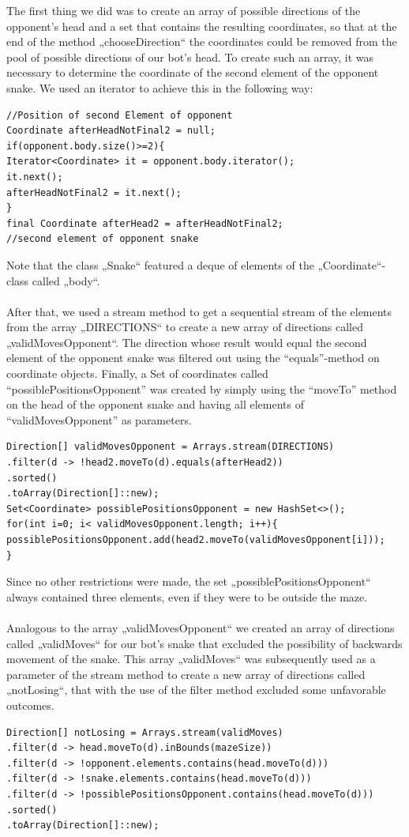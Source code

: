 \documentclass[a4paper,12pt]{article}
\begin{document}
The first thing we did was to create an array of possible directions of the opponent’s head and a set
that contains the resulting coordinates, so that at the end of the method „chooseDirection“ the
coordinates could be removed from the pool of possible directions of our bot’s head. To create such
an array, it was necessary to determine the coordinate of the second element of the opponent snake.
We used an iterator to achieve this in the following way:\\
\begin{verbatim}
//Position of second Element of opponent
Coordinate afterHeadNotFinal2 = null;
if(opponent.body.size()>=2){
Iterator<Coordinate> it = opponent.body.iterator();
it.next();
afterHeadNotFinal2 = it.next();
}
final Coordinate afterHead2 = afterHeadNotFinal2;
//second element of opponent snake
\end{verbatim}
Note that the class „Snake“ featured a deque of elements of the „Coordinate“-class called „body“.\\
\\
After that, we used a stream method to get a sequential stream of the elements from the array
„DIRECTIONS“ to create a new array of directions called „validMovesOpponent“. The direction
whose result would equal the second element of the opponent snake was filtered out using the “equals”-method on coordinate objects. Finally, a Set of coordinates called
“possiblePositionsOpponent” was created by simply using the “moveTo” method on the head of the
opponent snake and having all elements of “validMovesOpponent” as parameters.
\begin{verbatim}
Direction[] validMovesOpponent = Arrays.stream(DIRECTIONS)
.filter(d -> !head2.moveTo(d).equals(afterHead2))
.sorted()
.toArray(Direction[]::new);
Set<Coordinate> possiblePositionsOpponent = new HashSet<>();
for(int i=0; i< validMovesOpponent.length; i++){
possiblePositionsOpponent.add(head2.moveTo(validMovesOpponent[i]));
}
\end{verbatim}


Since no other restrictions were made, the set „possiblePositionsOpponent“ always contained three
elements, even if they were to be outside the maze.\\
\\
Analogous to the array „validMovesOpponent“ we created an array of directions called
„validMoves“ for our bot’s snake that excluded the possibility of backwards movement of the
snake. This array „validMoves“ was subsequently used as a parameter of the stream method to
create a new array of directions called „notLosing“, that with the use of the filter method excluded
some unfavorable outcomes.
\begin{verbatim}
Direction[] notLosing = Arrays.stream(validMoves)
.filter(d -> head.moveTo(d).inBounds(mazeSize))
.filter(d -> !opponent.elements.contains(head.moveTo(d)))
.filter(d -> !snake.elements.contains(head.moveTo(d)))
.filter(d -> !possiblePositionsOpponent.contains(head.moveTo(d)))
.sorted()
.toArray(Direction[]::new);
\end{verbatim}
\end{document}
